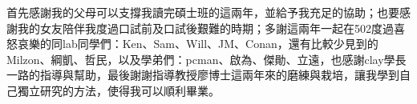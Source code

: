 \setcounter{page}{1}
\begin{acknowledgementszh}

首先感謝我的父母可以支撐我讀完碩士班的這兩年，並給予我充足的協助；也要感謝我的女友陪伴我度過口試前及口試後艱難的時期；多謝這兩年一起在502度過喜怒哀樂的同lab同學們：Ken、Sam、Will、JM、Conan，還有比較少見到的Milzon、綱凱、哲民，以及學弟們：pcman、啟為、傑勛、立遠，也感謝clay學長一路的指導與幫助，最後謝謝指導教授廖博士這兩年來的磨練與栽培，讓我學到自己獨立研究的方法，使得我可以順利畢業。

\end{acknowledgementszh}
